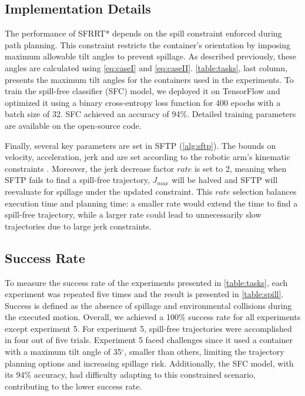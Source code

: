 \subsection{Implementation Details}
\label{subsec:implement-details}
The performance of SFRRT* depends on the spill constraint enforced during path planning. This constraint restricts the container's orientation by imposing maximum allowable tilt angles to prevent spillage. As described previously, these angles are calculated using \cref{eq:caseI} and \cref{eq:caseII}. \cref{table:tasks}, last column, presents the maximum tilt angles for the containers used in the experiments. To train the spill-free classifier (SFC) model, we deployed it on TensorFlow and optimized it using a binary cross-entropy loss function for 400 epochs with a batch size of 32. SFC achieved an accuracy of 94\%. Detailed training parameters are available on the open-source code.

\vspace{-15pt}
Finally, several key parameters are set in SFTP (\cref{alg:sftp}). The bounds on velocity, acceleration, jerk and are set according to the robotic arm's kinematic constraints \cite{panda}. Moreover, the jerk decrease factor $rate$ is set to 2, meaning when SFTP fails to find a spill-free trajectory, $J_{max}$ will be halved and SFTP will reevaluate for spillage under the updated constraint. This $rate$ selection balances execution time and planning time: a smaller rate would extend the time to find a spill-free trajectory, while a larger rate could lead to unnecessarily slow trajectories due to large jerk constraints. 
\subsection{Success Rate}
\label{subsec:successrate} To measure the success rate of the experiments presented in \cref{table:tasks}, each experiment was repeated five times and the result is presented in \cref{table:spill}. Success is defined as the absence of spillage and environmental collisions during the executed motion. Overall, we achieved a 100\% success rate for all experiments except experiment 5.
For experiment 5, spill-free trajectories were accomplished in four out of five trials. Experiment 5 faced challenges since 
it used a container with a maximum tilt angle of 35$^\circ$, smaller than others, limiting the trajectory planning options and increasing spillage risk. Additionally, the SFC model, with its 94\% accuracy, had difficulty adapting to this constrained scenario, contributing to the lower success rate.



